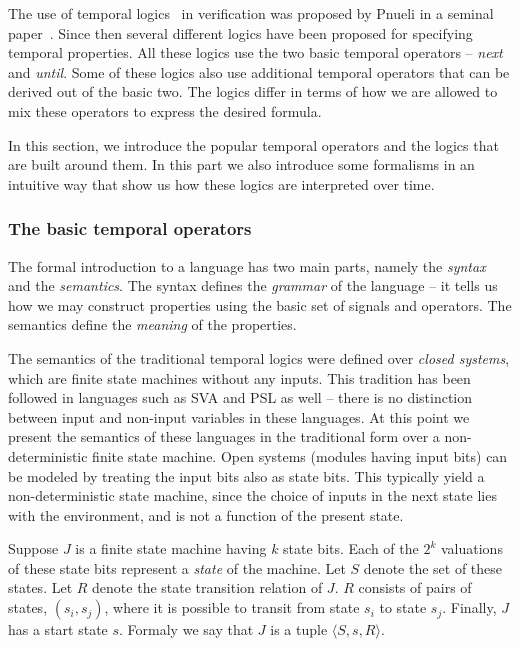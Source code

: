 The use of temporal logics~\cite{r17} in verification was proposed by Pnueli in a seminal
paper~\cite{r14}. Since then several different logics have been proposed
for specifying temporal properties. 
All these logics use the two basic temporal operators --
{\em next} and {\em until}. Some of these logics also use additional 
temporal operators that can be derived out of the basic two. The logics differ
in terms of how we are allowed to mix these operators to express the desired
formula.

\noindent
In this section, we introduce the popular
temporal operators and the logics that are built around them. In this part
we also introduce some formalisms in an intuitive way that show us how
these logics are interpreted over time.

\subsubsection{The basic temporal operators} \label{sec2.1} 

\noindent
The formal introduction to a language has two main parts, namely the 
{\em syntax} and the {\em semantics}. The syntax defines the {\em grammar}
of the language -- it tells us how we may construct properties using the
basic set of signals and operators. The semantics define the {\em meaning}
of the properties.

\noindent
The semantics of the traditional temporal logics were defined over {\em closed
systems}, which are finite state machines without any inputs. This tradition
has been followed in languages such as SVA and PSL as well -- there is no
distinction between input and non-input variables in these languages. At this
point we present the semantics of these languages in the traditional form
over a non-deterministic finite state machine. Open systems (modules having
input bits) can be modeled by treating the input bits also as state bits. This
typically yield a non-deterministic state machine, since the choice of
inputs in the next state lies with the environment, and is not a function of
the present state.

\noindent
Suppose $J$ is a finite state machine having $k$ state bits. Each of the $2^k$
valuations of these state bits represent a {\em state} of the machine.
Let $S$ denote the set of these states. Let $R$ denote the {state transition
relation} of $J$. $R$ consists of pairs of states, $(s_i, s_j)$, where it
is possible to transit from state $s_i$ to state $s_j$. Finally, $J$ has a
start state $s$. Formaly we say that $J$ is a tuple 
$\langle S, s, R \rangle$.

